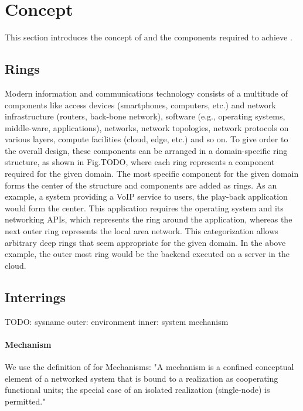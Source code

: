 \section{Concept}
\label{sec:design}

This section introduces the concept of \mm and the components required to achieve \mm.

\subsection{Rings}
Modern information and communications technology consists of a multitude of components like access devices (smartphones, computers, etc.) and network infrastructure (routers, back-bone network), software (e.g., operating systems, middle-ware, applications), networks, network topologies, network protocols on various layers, compute facilities (cloud, edge, etc.) and so on.
To give order to the overall design, these components can be arranged in a domain-specific ring structure, as shown in Fig.TODO, where each ring represents a component required for the given domain.
The most specific component for the given domain forms the center of the structure and components are added as rings.
As an example, a system providing a VoIP service to users, the play-back application would form the center.
This application requires the operating system and its networking APIs, which represents the ring around the application, whereas the next outer ring represents the local area network.
This categorization allows arbitrary deep rings that seem appropriate for the given domain.
In the above example, the outer most ring would be the backend executed on a server in the cloud.


\subsection{Interrings}



TODO:
sysname
outer: environment
inner: system
mechanism








\paragraph{Mechanism}

We use the definition of \cite{} for Mechanisms: "A mechanism is a confined conceptual element of a networked system that is bound to a realization as cooperating functional units; the special case of an isolated realization (single-node) is permitted."

